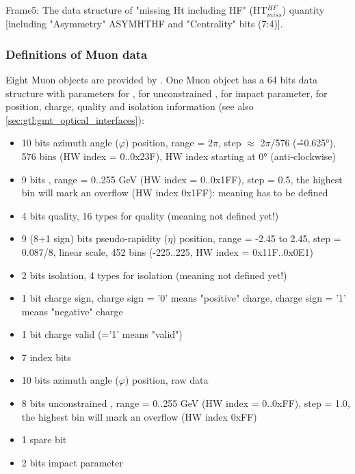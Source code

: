 Frame5: The data structure of "missing Ht including HF" (HT$_{miss}^{HF}$) quantity [including "Asymmetry" ASYMHTHF and "Centrality" bits (7:4)].

\clearpage

\subsubsection{Definitions of Muon data}
\label{sec:gtl:muon_data}
Eight Muon objects are provided by \gmt. One Muon object has a 64 bits data structure with parameters for \pt, for unconstrained \pt, for impact parameter, for position, charge, quality and isolation information (see also \ref{sec:gtl:gmt_optical_interfaces}):\\
\begin{itemize}
\item 10 bits azimuth angle ($\varphi$) position, range = 2$\pi$, step $\approx$ 2$\pi$/576 (\^=0.625°), 576 bins (HW index = 0..0x23F), HW index starting at 0° (anti-clockwise)
\item 9 bits \pt, range = 0..255 GeV (HW index = 0..0x1FF), step = 0.5, the highest bin will mark an overflow (HW index 0x1FF): meaning has to be defined
\item 4 bits quality, 16 types for quality (meaning not defined yet!)
\item 9 (8+1 sign) bits pseudo-rapidity ($\eta$) position, range = -2.45 to 2.45, step = 0.087/8, linear scale, 452 bins (-225..225, HW index = 0x11F..0x0E1)
\item 2 bits isolation, 4 types for isolation (meaning not defined yet!)
\item 1 bit charge sign, charge sign = '0' means "positive" charge, charge sign = '1' means "negative" charge
\item 1 bit charge valid (='1' means "valid")
\item 7 index bits
\item 10 bits azimuth angle ($\varphi$) position, raw data
\item 8 bits unconstrained \pt, range = 0..255 GeV (HW index = 0..0xFF), step = 1.0, the highest bin will mark an overflow (HW index 0xFF)
\item 1 spare bit
\item 2 bits impact parameter
\end{itemize}

